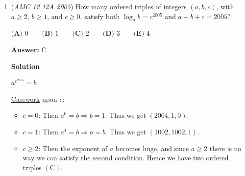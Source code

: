\begin{enumerate}
 Also, every time we change $f(x)$, the expression for the final answer in terms of $x$ will be in a different form (although they'll all satisfy the final equation), so we get a different starting value of $x$.  Every time we have two choices for $f(x$) and altogether we have to choose $2005$ times. Thus, $2^{2005}\Rightarrow\boxed{E}$.

 Note: the values of x that satisfy $f^{[n]}(x) = \frac {1}{2}$ are $\frac{1}{2^{n+1}}$, $\frac{3}{2^{n+1}}$, $\frac{5}{2^{n+1}}$, $\cdots$ ,$\frac{2^{n+1}-1}{2^{n+1}}$.

 



\textbf{Solution 2 (Engineers Induction)}

We are given that $f^{[2005]}(x) = \frac {1}{2}$. Thus,  $f(f^{[2004]}(x))=\frac{1}{2}$. Let $f^{[2004]}(x)$ be equal to $y$. Thus $f(y)=\frac{1}{2}$ or $y=\frac{1}{4}$ or $\frac{3}{4}$. Now we know $f^{[2004]}(x)$ is equal to $\frac{1}{4}$ or $\frac{3}{4}$. Now we know that $f(f^{[2003]}(x))=\frac{1}{4}$ or $\frac{3}{4}$. Now we solve for $f^{[2003]}(x)$ and let  $f^{[2003]}(x)=z$. Thus $f(z)$ is equal to $\frac{1}{8}$,$\frac{7}{8}$,$\frac{5}{8}$,and $\frac{3}{8}$. As we see, $f^{[2005]}(x)$ has 1 solution, $f^{[2004]}(x)$ has 2 solutions, and $f^{[2003]}(x)$ has 4 solutions. Thus for each iteration we double the number of possible solutions. There are $2005$ iterations and thus the number of solutions is $2^{2005}$ $\Rightarrow\boxed{E}$



	\item (\textit{AMC 12 12A 2005}) How many ordered triples of integers $(a,b,c)$, with $a \geq 2$, $b \geq 1$, and $c \geq 0$, satisfy both $\log_{a}b = c^{2005}$ and $a + b + c = 2005$?


 $\textbf{(A) } 0 \qquad \textbf{(B) } 1 \qquad \textbf{(C) } 2 \qquad \textbf{(D) } 3 \qquad \textbf{(E) } 4$

 \textbf{Answer: }C



\textbf{Solution}

$a^{c^{2005}} = b$

 \href{https://artofproblemsolving.com/wiki/index.php?title=Casework}{Casework} upon $c$:

 
            \begin{itemize}
        \item $c = 0$: Then $a^0 = b \Longrightarrow b = 1$. Thus we get $(2004,1,0)$.
        \item $c = 1$: Then $a^1 = b \Longrightarrow a = b$. Thus we get $(1002,1002,1)$.
        \item $c \ge 2$: Then the exponent of $a$ becomes huge, and since $a \ge 2$ there is no way we can satisfy the second condition. Hence we have two ordered triples $\mathrm{(C)}$.
            \end{itemize}
            



\end{enumerate}
